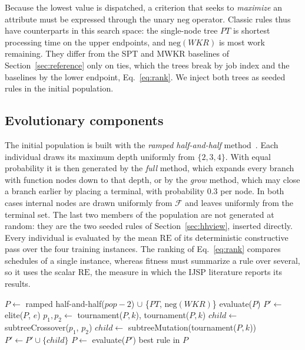 \documentclass[review,authoryear,11pt]{elsarticle}
\newcommand{\RE}{\mathrm{RE}}
\begin{document}
Because the lowest value is dispatched, a criterion that seeks to \emph{maximize}
an attribute must be expressed through the unary $\mathrm{neg}$
operator. Classic rules thus have counterparts in this search space: the
single-node tree $\mathit{PT}$ is shortest processing time on the upper
endpoints, and $\mathrm{neg}(\mathit{WKR})$ is most work remaining. They
differ from the SPT and MWKR baselines of Section~\ref{sec:reference}
only on ties, which the trees break by job index and the baselines by
the lower endpoint, Eq.~\eqref{eq:rank}. We inject both trees as seeded rules in the initial population.




\subsection{Evolutionary components}
\label{sec:evoview}
The initial population is built with the \emph{ramped half-and-half}
method~\citep{Koza1992,Poli2008}. Each individual draws its maximum
depth uniformly from $\{2,3,4\}$. With equal probability it is then
generated by the \emph{full} method, which expands every branch with
function nodes down to that depth, or by the \emph{grow} method, which
may close a branch earlier by placing a terminal, with probability
$0.3$ per node. In both cases internal nodes are drawn uniformly from
$\mathcal{F}$ and leaves uniformly from the terminal set. The last two members of the
population are not generated at random: they are the two seeded rules
of Section~\ref{sec:hhview}, inserted directly.
Every individual is evaluated by the mean $\RE$ of its
deterministic constructive pass over the four training instances.
The ranking of Eq.~\eqref{eq:rank} compares schedules of a single
instance, whereas fitness must summarize a rule over several, so it uses
the scalar $\RE$, the measure in which the IJSP literature reports its
results.

\begin{algorithm}[t]
\caption{GP hyper-heuristic for the IJSP}
\label{alg:gp}
\begin{algorithmic}[1]
\State $P \gets$ ramped half-and-half($\mathit{pop}-2$) $\cup$ \{$\mathit{PT}$, $\mathrm{neg}(\mathit{WKR})$\}
\State evaluate($P$) 
  \State $P' \gets$ elite($P$, $e$) 
      \State $p_1, p_2 \gets$ tournament($P,k$), tournament($P,k$)
      \State $\mathit{child} \gets$ subtreeCrossover($p_1$, $p_2$)
    \Else
      \State $\mathit{child} \gets$ subtreeMutation(tournament($P,k$))
    \EndIf
    \State $P' \gets P' \cup \{\mathit{child}\}$ 
  \EndWhile
  \State $P \gets$ evaluate($P'$)
\EndFor
\State \Return best rule in $P$
\end{algorithmic}
\end{algorithm}
\end{document}
